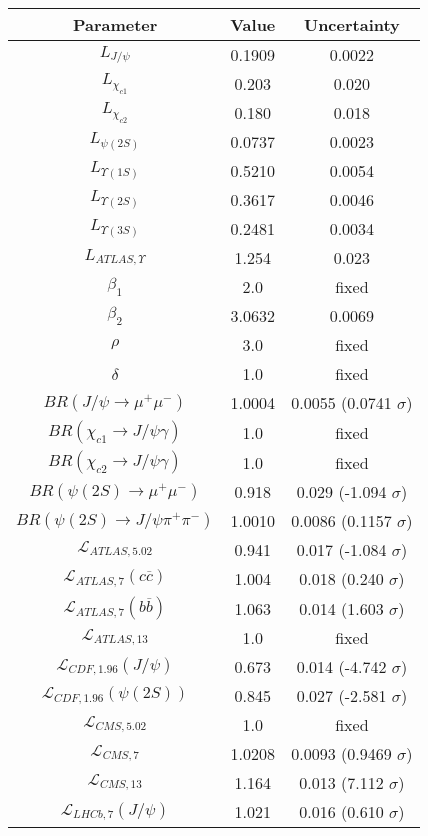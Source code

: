 \begin{table}[h!]
\centering
\begin{tabular}{c|c|c}
Parameter & Value & Uncertainty \\
\hline
$L_{J/\psi}$ & 0.1909 & 0.0022 \\
$L_{\chi_{c1}}$ & 0.203 & 0.020 \\
$L_{\chi_{c2}}$ & 0.180 & 0.018 \\
$L_{\psi(2S)}$ & 0.0737 & 0.0023 \\
$L_{\Upsilon(1S)}$ & 0.5210 & 0.0054 \\
$L_{\Upsilon(2S)}$ & 0.3617 & 0.0046 \\
$L_{\Upsilon(3S)}$ & 0.2481 & 0.0034 \\
$L_{ATLAS,\Upsilon}$ & 1.254 & 0.023 \\
$\beta_1$ & 2.0 & fixed \\
$\beta_2$ & 3.0632 & 0.0069 \\
$\rho$ & 3.0 & fixed \\
$\delta$ & 1.0 & fixed \\
$BR(J/\psi\rightarrow\mu^+\mu^-)$ & 1.0004 & 0.0055 (0.0741 $\sigma$) \\
$BR(\chi_{c1}\rightarrow J/\psi\gamma)$ & 1.0 & fixed \\
$BR(\chi_{c2}\rightarrow J/\psi\gamma)$ & 1.0 & fixed \\
$BR(\psi(2S)\rightarrow\mu^+\mu^-)$ & 0.918 & 0.029 (-1.094 $\sigma$) \\
$BR(\psi(2S)\rightarrow J/\psi\pi^+\pi^-)$ & 1.0010 & 0.0086 (0.1157 $\sigma$) \\
$\mathcal L_{ATLAS,5.02}$ & 0.941 & 0.017 (-1.084 $\sigma$) \\
$\mathcal L_{ATLAS,7}(c\overline c)$ & 1.004 & 0.018 (0.240 $\sigma$) \\
$\mathcal L_{ATLAS,7}(b\overline b)$ & 1.063 & 0.014 (1.603 $\sigma$) \\
$\mathcal L_{ATLAS,13}$ & 1.0 & fixed \\
$\mathcal L_{CDF,1.96}(J/\psi)$ & 0.673 & 0.014 (-4.742 $\sigma$) \\
$\mathcal L_{CDF,1.96}(\psi(2S))$ & 0.845 & 0.027 (-2.581 $\sigma$) \\
$\mathcal L_{CMS,5.02}$ & 1.0 & fixed \\
$\mathcal L_{CMS,7}$ & 1.0208 & 0.0093 (0.9469 $\sigma$) \\
$\mathcal L_{CMS,13}$ & 1.164 & 0.013 (7.112 $\sigma$) \\
$\mathcal L_{LHCb,7}(J/\psi)$ & 1.021 & 0.016 (0.610 $\sigma$) \\

\end{tabular}
\end{table}
